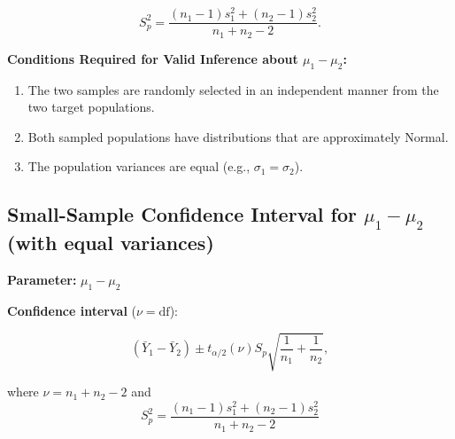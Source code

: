 \[
S_p^2 = \frac{(n_1 - 1)s_1^2 + (n_2 - 1)s_2^2}{n_1 + n_2 - 2}.
\]
\begin{tcolorbox}[
  colback=yellow!5,
  colframe=yellow!50!black,
  title={Comparing Two Populations Means: Independent Sampling (Equal Variances Assumed) (cont.)},
  sharp corners,
  boxrule=0.4pt,
  width=\textwidth,
  breakable
]

\textbf{Conditions Required for Valid Inference about $\mu_1 - \mu_2$:}

\begin{enumerate}
  \item The two samples are randomly selected in an independent manner from the two target populations.
  \item Both sampled populations have distributions that are approximately Normal.
  \item The population variances are equal (e.g., $\sigma_1 = \sigma_2$).
\end{enumerate}
\end{tcolorbox}
\subsection*{Small-Sample Confidence Interval for $\mu_1 - \mu_2$ (with equal variances)}

\textbf{Parameter:} $\mu_1 - \mu_2$

\vspace{0.5em}

\textbf{Confidence interval} ($\nu = \text{df}$):

\[
(\bar{Y}_1 - \bar{Y}_2) \pm t_{\alpha/2}(\nu) S_p \sqrt{\frac{1}{n_1} + \frac{1}{n_2}},
\]

where $\nu = n_1 + n_2 - 2$ and
\[
S_p^2 = \frac{(n_1 - 1)s_1^2 + (n_2 - 1)s_2^2}{n_1 + n_2 - 2}
\]

